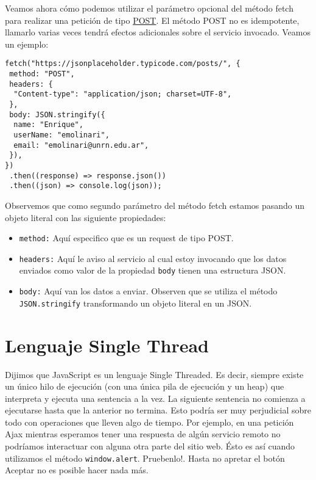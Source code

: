 \documentclass[a4paper, oneside, titlepage, 12pt]{paper}
\begin{document}
Veamos ahora cómo podemos utilizar el parámetro opcional del método fetch para realizar una petición de tipo \href{https://developer.mozilla.org/es/docs/Web/HTTP/Methods/POST}{POST}. El método POST no es idempotente, llamarlo varias veces tendrá efectos adicionales sobre el servicio invocado. Veamos un ejemplo:

\begin{verbatim}
fetch("https://jsonplaceholder.typicode.com/posts/", {
 method: "POST",
 headers: {
  "Content-type": "application/json; charset=UTF-8",
 },
 body: JSON.stringify({
  name: "Enrique",
  userName: "emolinari",
  email: "emolinari@unrn.edu.ar",
 }),
})
 .then((response) => response.json())
 .then((json) => console.log(json));
\end{verbatim}

Observemos que como segundo parámetro del método fetch estamos pasando un objeto literal con las siguiente propiedades:

\begin{itemize}
 \item \texttt{method:} Aquí especifico que es un request de tipo POST. 
 \item \texttt{headers:} Aquí le aviso al servicio al cual estoy invocando que los datos enviados como valor de la propiedad \texttt{body} tienen una estructura JSON. 
 \item \texttt{body:} Aquí van los datos a enviar. Observen que se utiliza el método \texttt{JSON.stringify} transformando un objeto literal en un JSON. 
\end{itemize}

\section{Lenguaje Single Thread} \label{single_thread}

Dijimos que JavaScript es un lenguaje Single Threaded. Es decir, siempre existe un único hilo de ejecución (con una única pila de ejecución y un heap) que interpreta y ejecuta una sentencia a la vez. La siguiente sentencia no comienza a ejecutarse hasta que la anterior no termina. Esto podría ser muy perjudicial sobre todo con operaciones que lleven algo de tiempo. Por ejemplo, en una petición Ajax mientras esperamos tener una respuesta de algún servicio remoto no podríamos interactuar con alguna otra parte del sitio web. Ésto es así cuando utilizamos el método \texttt{window.alert}. Pruebenlo!. Hasta no apretar el botón Aceptar no es posible hacer nada más.
\newline
\end{document}
